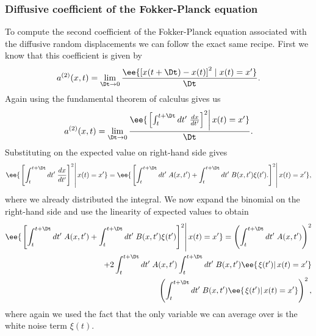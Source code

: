 \subsubsection{Diffusive coefficient of the Fokker-Planck equation}

To compute the second coefficient of the Fokker-Planck equation associated with
the diffusive random displacements we can follow the exact same recipe. First
we know that this coefficient is given by
\begin{equation}
    a^{(2)}(x, t) = \lim_{\Dt \rightarrow 0}
    {\ee{\left[x(t + \Dt) - x(t)\right]^2 \mid x(t) = x'} \over \Dt}.
\end{equation}
Again using the fundamental theorem of calculus gives us
\begin{equation}
    a^{(2)}(x, t) = \lim_{\Dt \rightarrow 0}
    {\ee{ \left. \left[ 
    \int_t^{t + \Dt} dt'\; {dx \over dt'}
    \right]^2 \right\vert x(t) = x'} \over \Dt}.
\end{equation}
Substituting  on the expected value on right-hand side gives
\begin{equation}
    \ee{ \left. \left[ 
    \int_t^{t + \Dt} dt'\; {dx \over dt'}
    \right]^2 \right\vert x(t) = x'} =
    \ee{ \left. \left[ 
    \int_t^{t + \Dt} dt'\; A(x, t') + 
    \int_t^{t + \Dt} dt'\; B(x, t') \xi(t').
    \right]^2 \right\vert x(t) = x'},
\end{equation}
where we already distributed the integral. We now expand the binomial on the
right-hand side and use the linearity of expected values to obtain
\begin{equation}
    \begin{aligned}
    \ee{ \left. \left[ 
    \int_t^{t + \Dt} dt'\; A(x, t') + 
    \int_t^{t + \Dt} dt'\; B(x, t') \xi(t')
    \right]^2 \right\vert x(t) = x'} =
    \left(  
    \int_t^{t + \Dt} dt'\; A(x, t')
    \right)^2\\
    + 2 
    \int_t^{t + \Dt} dt'\; A(x, t')
    \int_t^{t + \Dt} dt'\; B(x, t') \ee{ \left.\xi(t')
    \right\vert x(t) = x'}\\
    \left(
    \int_t^{t + \Dt} dt'\; B(x, t') \ee{\left.\xi(t')
    \right\vert x(t) = x'}
    \right)^2,
    \end{aligned}
\end{equation}
where again we used the fact that the only variable we can average over is the
white noise term $\xi(t)$.

